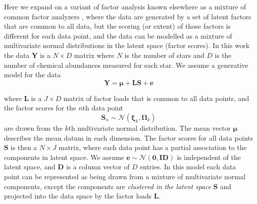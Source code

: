 \documentclass[twocolumn]{aastex62}
\newcommand{\vect}[1]{\boldsymbol{\mathbf{#1}}}
\renewcommand{\vec}[1]{\vect{#1}}
\newcommand{\data}{\textbf{Y}}
\newcommand{\vecdata}{\vec\data}
\newcommand{\eye}{\textbf{I}}
\newcommand{\factorloads}{\textbf{L}}
\newcommand{\factorscores}{\textbf{S}}
\newcommand{\specificvariance}{\vec{D}}
\newcommand{\NumData}{N}
\newcommand{\NumDimensions}{D}
\newcommand{\numdata}{n}
\newcommand{\NumLatentFactors}{J}
\newcommand{\numcomponents}{k}
\begin{document}
Here we expand on a variant of factor analysis known elsewhere as a mixture of common 
factor analyzers \citep{Baek:2010}, where the data are generated by a set of 
latent factors that are common to all data, but the scoring (or extent) of those
factors is different for each data point, and the data can be modelled as a
mixture of multivariate normal distributions in the latent space (factor scores).
In this work the data $\vecdata$ is a 
$\NumData \times \NumDimensions$ matrix where $\NumData$ is the number of 
stars and $\NumDimensions$ is the number of chemical abundances measured 
for each star. We assume a generative model for the data 
\begin{equation}
	\vecdata = \vec\mu + \factorloads\factorscores + \vec{e}
	\label{eq:generative-model}
\end{equation}

\noindent{}where $\factorloads$ is a $\NumLatentFactors \times \NumDimensions$ 
matrix of factor loads that is common to all data points, and the factor scores 
for the $\numdata$th data point
\begin{equation}
	\factorscores_\numdata \sim \mathcal{N}(\vec\xi_\numcomponents, \vec\Omega_\numcomponents)
\end{equation}
\noindent{}are drawn from the $\numcomponents$th multivariate normal distribution.
The mean vector $\vec\mu$ describes the mean datum in each dimension.
The factor scores for all data points $\factorscores$ is then a 
$\NumData \times \NumLatentFactors$ matrix, where each data point has a partial
association to the components in latent space. 
We assume $\vec{e} \sim \mathcal{N}\left(\vec{0}, \eye\specificvariance\right)$
is independent of the latent space, and $\specificvariance$ is a
column vector of $\NumDimensions$ entries. 
In this model each data point can be represented as being drawn
from a mixture of multivariate normal components, except the components
are \emph{clustered in the latent space} $\factorscores$ and projected
into the data space by the factor loads $\factorloads$. 
\end{document}
